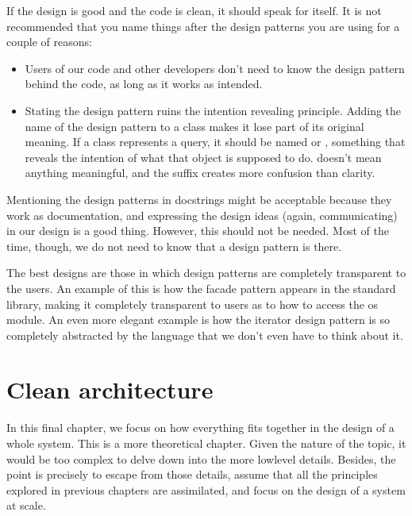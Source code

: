\documentclass[a4paper,10pt,english]{sphinxmanual}
\begin{document}
If the design is good and the code is clean, it should speak for itself. It is not recommended
that you name things after the design patterns you are using for a couple of reasons:
\begin{itemize}
\item {} 
Users of our code and other developers don’t need to know the design pattern behind the code, as long as it works as intended.

\item {} 
Stating the design pattern ruins the intention revealing principle. Adding the name of the design pattern to a class makes it lose part of its original meaning. If a class represents a query, it should be named  or , something that reveals the intention of what that object is supposed to do.  doesn’t mean anything meaningful, and the  suffix creates more confusion than clarity.

\end{itemize}

Mentioning the design patterns in docstrings might be acceptable because they work as
documentation, and expressing the design ideas (again, communicating) in our design is a
good thing. However, this should not be needed. Most of the time, though, we do not need
to know that a design pattern is there.

The best designs are those in which design patterns are completely transparent to the users.
An example of this is how the facade pattern appears in the standard library, making it
completely transparent to users as to how to access the os module. An even more elegant
example is how the iterator design pattern is so completely abstracted by the language that
we don’t even have to think about it.


\chapter{Clean architecture}
\label{\detokenize{chapters/10_clean_architecture/index:clean-architecture}}\label{\detokenize{chapters/10_clean_architecture/index::doc}}
In this final chapter, we focus on how everything fits together in the design of a whole
system. This is a more theoretical chapter. Given the nature of the topic, it would be too
complex to delve down into the more low\sphinxhyphen{}level details. Besides, the point is precisely to
escape from those details, assume that all the principles explored in previous chapters are
assimilated, and focus on the design of a system at scale.
\end{document}
